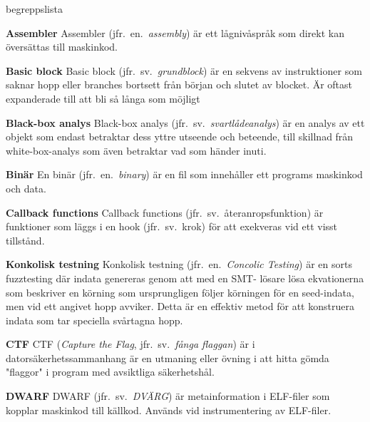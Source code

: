 \begin{labeling}{begreppslista}

    \item [\textbf{Assembler}] Assembler (jfr.\ en.\ \emph{assembly}) är ett
    lågnivåspråk som direkt kan översättas till maskinkod.

    \item[\textbf{Basic block}] Basic block (jfr.\ sv.\ \emph{grundblock}) är en
    sekvens av instruktioner som saknar hopp eller branches bortsett från
    början och slutet av blocket. Är oftast expanderade till att bli så långa
    som möjligt

    \item [\textbf{Black-box analys}] Black-box analys (jfr.\ sv.\
    \emph{svartlådeanalys}) är en analys av ett objekt som endast betraktar dess
    yttre utseende och beteende, till skillnad från white-box-analys som även
    betraktar vad som händer inuti.

    \item [\textbf{Binär}] En binär (jfr.\ en.\ \emph{binary}) är en fil som
    innehåller ett programs maskinkod och data.

    \item [\textbf{Callback functions}] Callback functions (jfr.\ sv.\
    återanropsfunktion) är funktioner som läggs i en hook (jfr.\ sv.\ krok) för
    att exekveras vid ett visst tillstånd.


    \item [\textbf{Konkolisk testning}] Konkolisk testning (jfr.\ en.\ \emph{Concolic
        Testing}) är en sorts fuzztesting där indata genereras genom att med en SMT-
    lösare lösa ekvationerna som beskriver en körning som ursprungligen följer
    körningen för en seed-indata, men vid ett angivet hopp avviker. Detta är en
    effektiv metod för att konstruera indata som tar speciella svårtagna hopp.

    \item [\textbf{CTF}] CTF (\emph{Capture the Flag}, jfr.\ sv.\ \emph{fånga
        flaggan}) är i datorsäkerhetssammanhang är en utmaning eller övning i att
    hitta gömda "flaggor" i program med avsiktliga säkerhetshål.

    \item [\textbf{DWARF}] DWARF (jfr.\ sv.\ \emph{DVÄRG}) är metainformation i
    ELF-filer som kopplar maskinkod till källkod. Används vid instrumentering av
    ELF-filer.


\end{labeling}
